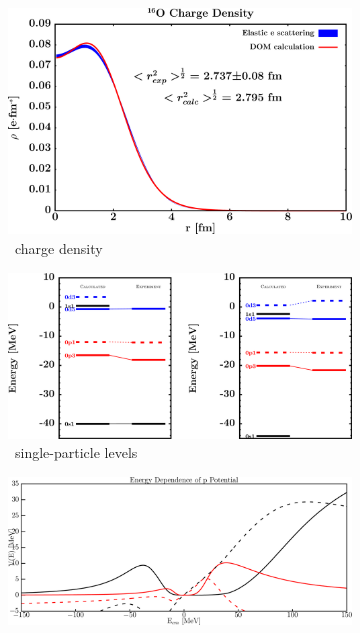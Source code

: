 \begin{figure}[hbtp]
    \captionsetup[subfigure]{labelformat=empty}
    \centering
    \begin{subfigure}[b]{0.45\textwidth}
        \centering
        \includegraphics[width=\linewidth]{figures/o16_chargeDensity.png}
        \caption{\oSix\ charge density}
        \label{DOMFitData_o16_chargeDensity}
    \end{subfigure}\hspace{6pt}
    \begin{subfigure}[b]{0.45\textwidth}
        \centering
        \includegraphics[width=\linewidth]{figures/o16_SPLevels.png}
        \caption{\oSix\ single-particle levels}
        \label{DOMFitData_o16_SPLevels}
    \end{subfigure}\vspace{0.3in}
    \begin{subfigure}[b]{0.45\textwidth}
        \centering
        \includegraphics[width=\linewidth]{figures/o16_protonPotentials.png}

\end{subfigure}
\end{figure}
